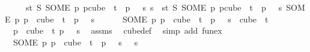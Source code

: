 \begin{isabellebody}
\ \ \ \ \ {\isachardoublequoteopen}{\isacharparenleft}{\kern0pt}{\isasymlambda}s{\isasymin}{\isacharbraceleft}{\kern0pt}{\isachardot}{\kern0pt}{\isachardot}{\kern0pt}{\isacharless}{\kern0pt}t{\isacharbraceright}{\kern0pt}{\isachardot}{\kern0pt}\ S\ {\isacharparenleft}{\kern0pt}SOME\ p{\isachardot}{\kern0pt}\ p{\isasymin}cube\ {}\ t\ {\isasymand}\ p\ {}\ {\isacharequal}{\kern0pt}\ s{\isacharparenright}{\kern0pt}{\isacharparenright}{\kern0pt}\ s\ {\isacharequal}{\kern0pt}\ {\isacharparenleft}{\kern0pt}{\isasymlambda}s{\isasymin}{\isacharbraceleft}{\kern0pt}{\isachardot}{\kern0pt}{\isachardot}{\kern0pt}{\isacharless}{\kern0pt}t{\isacharbraceright}{\kern0pt}{\isachardot}{\kern0pt}\ S\ {\isacharparenleft}{\kern0pt}SOME\ p{\isachardot}{\kern0pt}\ p{\isasymin}cube\ {}\ t\ {\isasymand}\ p\ {}\ {\isacharequal}{\kern0pt}\ s{\isacharparenright}{\kern0pt}{\isacharparenright}{\kern0pt}\ {\isacharparenleft}{\kern0pt}{\isacharparenleft}{\kern0pt}SOME\ p{\isachardot}{\kern0pt}\ p\ {\isasymin}\ cube\ {}\ t\ {\isasymand}\ p\ {}\ {\isacharequal}{\kern0pt}\ s{\isacharparenright}{\kern0pt}\ {}{\isacharparenright}{\kern0pt}{\isachardoublequoteclose}\isanewline
\ \ \ \ \ {\isachardoublequoteopen}{\isacharparenleft}{\kern0pt}SOME\ p{\isachardot}{\kern0pt}\ p\ {\isasymin}\ cube\ {}\ t\ {\isasymand}\ p\ {}\ {\isacharequal}{\kern0pt}\ s{\isacharparenright}{\kern0pt}\ {\isasymin}\ cube\ {}\ t{\isachardoublequoteclose}\isanewline
%
\isadelimproof
%
\endisadelimproof
%
\isatagproof
{}\isamarkupfalse%
\ {\isacharminus}{\kern0pt}\isanewline
\ \ \isamarkupfalse%
\ {}{\isacharcolon}{\kern0pt}\ {\isachardoublequoteopen}{\isasymexists}p\ {\isasymin}\ cube\ {}\ t{\isachardot}{\kern0pt}\ p\ {}\ {\isacharequal}{\kern0pt}\ s{\isachardoublequoteclose}\ \isamarkupfalse%
\ assms\ \isamarkupfalse%
\ cube{\isacharunderscore}{\kern0pt}def\ \isamarkupfalse%
\ {\isacharparenleft}{\kern0pt}simp\ add{\isacharcolon}{\kern0pt}\ fun{\isacharunderscore}{\kern0pt}ex{\isacharparenright}{\kern0pt}\isanewline
\ \ \isamarkupfalse%
\ {}{\isacharcolon}{\kern0pt}\ {\isachardoublequoteopen}{\isacharparenleft}{\kern0pt}SOME\ p{\isachardot}{\kern0pt}\ p\ {\isasymin}\ cube\ {}\ t\ {\isasymand}\ p\ {}\ {\isacharequal}{\kern0pt}\ s{\isacharparenright}{\kern0pt}\ {}\ {\isacharequal}{\kern0pt}\ s{\isachardoublequoteclose}\ \isamarkupfalse%

\end{isabellebody}
